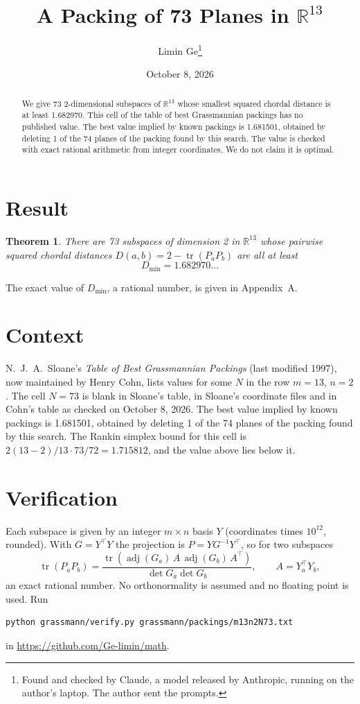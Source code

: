 \documentclass[11pt,a4paper]{article}
\title{A Packing of 73 Planes in $\mathbb{R}^{13}$}
\author{Limin Ge\thanks{Found and checked by Claude, a model released by Anthropic, running on the author's laptop. The author sent the prompts.}}
\date{October 8, 2026}
\newtheorem*{theorem}{Theorem}
\begin{document}
\maketitle
\begin{abstract}
We give 73 2-dimensional subspaces of $\mathbb{R}^{13}$ whose smallest squared chordal distance is at least 1.682970. This cell of the table of best Grassmannian packings has no published value. The best value implied by known packings is 1.681501, obtained by deleting 1 of the 74 planes of the packing found by this search. The value is checked with exact rational arithmetic from integer coordinates. We do not claim it is optimal.
\end{abstract}

\section{Result}
\begin{theorem}
There are 73 subspaces of dimension 2 in $\mathbb{R}^{13}$ whose pairwise squared chordal distances $D(a,b) = 2 - \operatorname{tr}(P_aP_b)$ are all at least
\[ D_{\min} = 1.682970\ldots \]
\end{theorem}
The exact value of $D_{\min}$, a rational number, is given in Appendix~A.


\section{Context}
N.~J.~A.~Sloane's \emph{Table of Best Grassmannian Packings} (last modified 1997), now maintained by Henry Cohn, lists values for some $N$ in the row $m=13$, $n=2$. The cell $N=73$ is blank in Sloane's table, in Sloane's coordinate files and in Cohn's table as checked on October 8, 2026. The best value implied by known packings is 1.681501, obtained by deleting 1 of the 74 planes of the packing found by this search. The Rankin simplex bound for this cell is $2(13-2)/13\cdot 73/72 = 1.715812$, and the value above lies below it.


\section{Verification}
Each subspace is given by an integer $m\times n$ basis $Y$ (coordinates times $10^{12}$, rounded). With $G=Y^\top Y$ the projection is $P=YG^{-1}Y^\top$, so for two subspaces
\[ \operatorname{tr}(P_aP_b)=\frac{\operatorname{tr}(\operatorname{adj}(G_a)\,A\,\operatorname{adj}(G_b)\,A^\top)}{\det G_a\det G_b},\qquad A=Y_a^\top Y_b, \]
an exact rational number. No orthonormality is assumed and no floating point is used. Run
\begin{verbatim}
python grassmann/verify.py grassmann/packings/m13n2N73.txt
\end{verbatim}
in \url{https://github.com/Ge-limin/math}.
\end{document}
